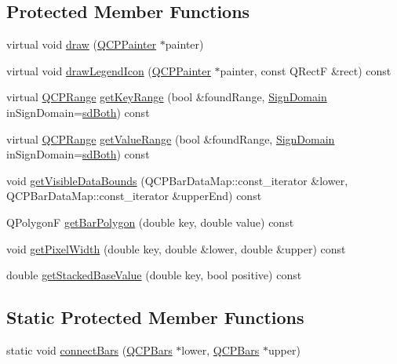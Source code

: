 \subsection*{Protected Member Functions}
\begin{DoxyCompactItemize}
\item 
virtual void \hyperlink{classQCPBars_a42b894e34dac799f90ff3700706b31df}{draw} (\hyperlink{classQCPPainter}{Q\+C\+P\+Painter} $\ast$painter)
\item 
virtual void \hyperlink{classQCPBars_ad4fb35d2ab7d2aa460a6612aff3e7a15}{draw\+Legend\+Icon} (\hyperlink{classQCPPainter}{Q\+C\+P\+Painter} $\ast$painter, const Q\+RectF \&rect) const 
\item 
virtual \hyperlink{classQCPRange}{Q\+C\+P\+Range} \hyperlink{classQCPBars_a93cfdc8a535f36aeb087acca49c00662}{get\+Key\+Range} (bool \&found\+Range, \hyperlink{classQCPAbstractPlottable_a661743478a1d3c09d28ec2711d7653d8}{Sign\+Domain} in\+Sign\+Domain=\hyperlink{classQCPAbstractPlottable_a661743478a1d3c09d28ec2711d7653d8a082b98cfb91a7363a3b5cd17b0c1cd60}{sd\+Both}) const 
\item 
virtual \hyperlink{classQCPRange}{Q\+C\+P\+Range} \hyperlink{classQCPBars_ada96e20309570d1488c165596cb2647f}{get\+Value\+Range} (bool \&found\+Range, \hyperlink{classQCPAbstractPlottable_a661743478a1d3c09d28ec2711d7653d8}{Sign\+Domain} in\+Sign\+Domain=\hyperlink{classQCPAbstractPlottable_a661743478a1d3c09d28ec2711d7653d8a082b98cfb91a7363a3b5cd17b0c1cd60}{sd\+Both}) const 
\item 
void \hyperlink{classQCPBars_af73d2032be0a64d2692bb76b08c79ec2}{get\+Visible\+Data\+Bounds} (Q\+C\+P\+Bar\+Data\+Map\+::const\+\_\+iterator \&lower, Q\+C\+P\+Bar\+Data\+Map\+::const\+\_\+iterator \&upper\+End) const 
\item 
Q\+PolygonF \hyperlink{classQCPBars_a1d118a76662cfd691a78c6f573e3f78c}{get\+Bar\+Polygon} (double key, double value) const 
\item 
void \hyperlink{classQCPBars_a794eefe4fb29b9b40583654ccbf460dc}{get\+Pixel\+Width} (double key, double \&lower, double \&upper) const 
\item 
double \hyperlink{classQCPBars_ae9b0c2fad9f29030c84bb6e62a4b605f}{get\+Stacked\+Base\+Value} (double key, bool positive) const 
\end{DoxyCompactItemize}
\subsection*{Static Protected Member Functions}
\begin{DoxyCompactItemize}
\item 
static void \hyperlink{classQCPBars_a6ea37802cd22f97235cab614b14b9f19}{connect\+Bars} (\hyperlink{classQCPBars}{Q\+C\+P\+Bars} $\ast$lower, \hyperlink{classQCPBars}{Q\+C\+P\+Bars} $\ast$upper)
\end{DoxyCompactItemize}
